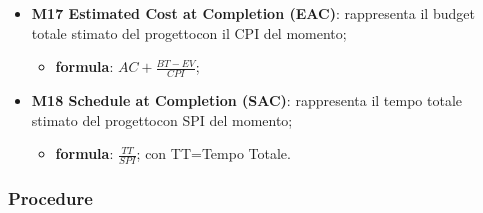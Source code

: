 \begin{itemize}
			\item \textbf{M17 Estimated Cost at Completion (EAC)}: rappresenta il budget totale stimato del progetto\glosp con il CPI del momento;
			\begin{itemize}
				\item[] \textbf{formula}: $AC+\frac{BT-EV}{CPI}$; 
			\end{itemize} 
			
			\item \textbf{M18 Schedule at Completion (SAC)}: rappresenta il tempo totale stimato del progetto\glosp con SPI del momento;
			\begin{itemize}
				\item[] \textbf{formula}: $\frac{TT}{SPI}$; con TT=Tempo Totale. 
			\end{itemize} 
		\end{itemize}	
		\subsubsection{Procedure}
